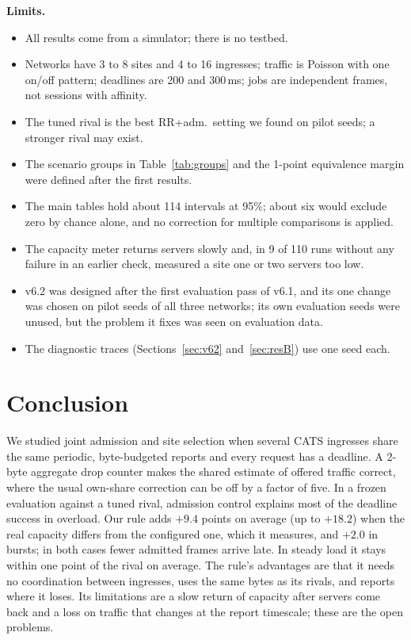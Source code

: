 \documentclass[conference]{IEEEtran}
\begin{document}
\textbf{Limits.}
\begin{itemize}
\item All results come from a simulator; there is no testbed.
\item Networks have 3 to 8 sites and 4 to 16 ingresses; traffic is Poisson with one on/off pattern; deadlines are 200 and 300\,ms; jobs are independent frames, not sessions with affinity.
\item The tuned rival is the best RR+adm.\ setting we found on pilot seeds; a stronger rival may exist.
\item The scenario groups in Table~\ref{tab:groups} and the 1-point equivalence margin were defined after the first results.
\item The main tables hold about 114 intervals at 95\%; about six would exclude zero by chance alone, and no correction for multiple comparisons is applied.
\item The capacity meter returns servers slowly and, in 9 of 110 runs without any failure in an earlier check, measured a site one or two servers too low.
\item v6.2 was designed after the first evaluation pass of v6.1, and its one change was chosen on pilot seeds of all three networks; its own evaluation seeds were unused, but the problem it fixes was seen on evaluation data.
\item The diagnostic traces (Sections~\ref{sec:v62} and~\ref{sec:resB}) use one seed each.
\end{itemize}

\section{Conclusion}\label{sec:conclusion}
We studied joint admission and site selection when several CATS ingresses share the same periodic, byte-budgeted reports and every request has a deadline. A 2-byte aggregate drop counter makes the shared estimate of offered traffic correct, where the usual own-share correction can be off by a factor of five. In a frozen evaluation against a tuned rival, admission control explains most of the deadline success in overload. Our rule adds $+9.4$ points on average (up to $+18.2$) when the real capacity differs from the configured one, which it measures, and $+2.0$ in bursts; in both cases fewer admitted frames arrive late. In steady load it stays within one point of the rival on average. The rule's advantages are that it needs no coordination between ingresses, uses the same bytes as its rivals, and reports where it loses. Its limitations are a slow return of capacity after servers come back and a loss on traffic that changes at the report timescale; these are the open problems.



\end{document}
